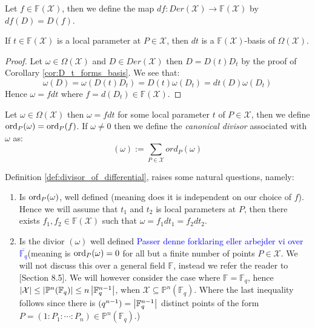 Let $f \in \mathbb{F}(\mathcal{X})$, then we define the map $df: Der(\mathcal{X}) \to \mathbb{F}(\mathcal{X})$ by $df(D) = D(f)$.

\begin{theorem}
If $t \in \mathbb{F}(\mathcal{X})$ is a local parameter at $P \in \mathcal{X}$, then $dt$ is a $\mathbb{F}(\mathcal{X})$-basis of $\Omega(\mathcal{X})$.
\end{theorem}
\begin{proof}
  Let $\omega \in \Omega(\mathcal{X})$ and $D \in Der(\mathcal{X})$ then $D = D(t)D_{t}$ by the proof of Corollary \ref{cor:D_t_forms_basis}. We see that:
  \begin{equation*}
    \omega (D) = \omega(D(t)D_t) = D(t) \omega(D_t) = dt(D) \omega(D_t)
  \end{equation*}
  Hence $\omega = fdt$ where $f = d(D_t) \in \mathbb{F}(\mathcal{X})$.
\end{proof}



\begin{definition}\label{def:divisor_of_differential}
  Let $\omega \in \Omega(\mathcal{X})$ then $\omega = f dt$ for some local parameter $t$ of $P \in \mathcal{X}$, then we define $\textnormal{ord}_P(\omega) = \textnormal{ord}_P(f)$. If $\omega \neq 0$ then we define the \textit{canonical divisor} associated with $\omega$ as:
  \begin{equation*}
    (\omega) := \sum_{P \in \mathcal{X}} ord_P(\omega)
  \end{equation*}
\end{definition}
Definition \ref{def:divisor_of_differential}, raises some natural questions, namely:
\begin{enumerate}
  \item Is $\textnormal{ord}_P(\omega)$, well defined (meaning does it is independent on our choice of $f$). Hence we will assume that $t_1$ and $t_2$ is local parameters at $P$, then there exists $f_1, f_2 \in \mathbb{F}(\mathcal{X})$ such that $\omega = f_1 dt_1 = f_2 dt_2$.
  \item Is the divior $(\omega)$ well defined \textcolor{blue}{Passer denne forklaring eller arbejder vi over $\overline{\mathbb{F}_{q}}$}(meaning is $\textnormal{ord}_P(\omega) = 0$ for all but a finite number of points $P \in \mathcal{X}$. We will not discuss this over a general field $\mathbb{F}$, instead we refer the reader to \cite{Fulton}[Section 8.5]. We will however consider the case where $\mathbb{F} = \mathbb{F}_q$, hence $\left\lvert\mathcal{X}\right\rvert \leq \left\lvert\mathbb{P}^n(\mathbb{F}_q)\right\rvert \leq n \left\lvert\mathbb{F}_q^{n - 1}\right\rvert$, when $\mathcal{X} \subseteq \mathbb{P}^n(\mathbb{F}_q)$. Where the last inequality follows since there is $(q^{n - 1}) = \left\lvert\mathbb{F}_q^{n - 1}\right\rvert$ distinct points of the form $P = (1 : P_1 : \cdots :  P_{n}) \in \mathbb{P}^n(\mathbb{F}_q)$.)
\end{enumerate}

